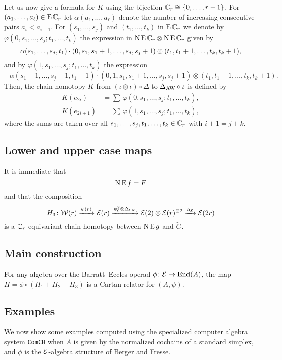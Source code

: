 Let us now give a formula for $K$ using the bijection $\mathbb{C}_r \cong \{0,\dots,r-1\}$.
For $(a_1,\dots,a_\ell) \in \operatorname{E}\mathbb{C}_r$ let $\alpha(a_1,\dots,a_\ell)$ denote the number of increasing consecutive pairs $a_i < a_{i+1}$.
For $(s_1,\dots,s_j)$ and $(t_1,\dots,t_k)$ in $\operatorname{E}\mathbb{C}_r$ we denote by $\varphi(0,s_1,\dots,s_j;t_1,\dots,t_k)$ the expression in $\operatorname{N} \operatorname{E} \mathbb{C}_r \otimes \operatorname{N} \operatorname{E} \mathbb{C}_r$ given by
\[
\alpha(s_1,\dots,s_j,t_1) \cdot
(0,s_1,s_1+1,\dots,s_j,s_j+1) \otimes
(t_1,t_1+1,\dots,t_k,t_k+1),
\]
and by $\varphi(1,s_1,\dots,s_j;t_1,\dots,t_k)$ the expression
\begin{equation*}
	- \alpha(s_1-1,\dots,s_j-1,t_1-1) \cdot
	(0,1,s_1,s_1+1,\dots,s_j,s_j+1)\otimes (t_1,t_1+1,\dots,t_k,t_k+1).
\end{equation*}
Then, the chain homotopy $K$ from $(\iota\otimes \iota) \circ \Delta$ to $\Delta_{\operatorname{AW}}\circ \iota$ is defined by
\[
\begin{split}
	K(e_{2i})   &= \sum \, \varphi(0,s_1,\dots,s_j;t_1,\dots,t_k), \\
	K(e_{2i+1}) &= \sum \, \varphi(1,s_1,\dots,s_j;t_1,\dots,t_k),
\end{split}
\]
where the sums are taken over all $s_1,\dots,s_j,t_1,\dots,t_k \in \mathbb{C}_r$ with $i+1 = j+k$.

\subsection{Lower and upper case maps}

It is immediate that
\[
\operatorname{N}\operatorname{E} f = F
\]
and that the composition
\[
H_3 \colon \mathcal{W}(r) \xrightarrow{\psi(r)} \mathcal{E}(r) \xrightarrow{\psi^2_0 \otimes \Delta_{\operatorname{Shi}}} \mathcal{E}(2) \otimes \mathcal{E}(r)^{\otimes 2} \xrightarrow{\bm{\circ}_{\mathcal{E}}} \mathcal{E}(2r)
\]
is a $\mathbb{C}_r$-equivariant chain homotopy between $\operatorname{N}\operatorname{E} g$ and $\widetilde G$.

\subsection{Main construction}

\begin{theorem}
	For any algebra over the Barratt--Eccles operad $\phi \colon \mathcal{E} \to \mathrm{End}(A)$, the map $H = \phi \circ (H_1 + H_2 + H_3)$ is a Cartan relator for $(A,\psi)$.
\end{theorem}

\subsection{Examples}

We now show some examples computed using the specialized computer algebra system \texttt{ComCH} \cite{medina2021comch} when $A$ is given by the normalized cochains of a standard simplex, and $\phi$ is the $\mathcal{E}$-algebra structure of Berger and Fresse.
